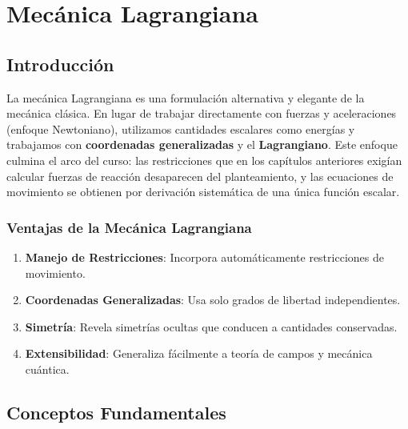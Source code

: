 
\chapter{Mecánica Lagrangiana}

\section*{Introducción}

La mecánica Lagrangiana es una formulación alternativa y elegante de la mecánica clásica. En lugar de trabajar directamente con fuerzas y aceleraciones (enfoque Newtoniano), utilizamos cantidades escalares como energías y trabajamos con \textbf{coordenadas generalizadas} y el \textbf{Lagrangiano}. Este enfoque culmina el arco del curso: las restricciones que en los capítulos anteriores exigían calcular fuerzas de reacción desaparecen del planteamiento, y las ecuaciones de movimiento se obtienen por derivación sistemática de una única función escalar.

\subsection*{Ventajas de la Mecánica Lagrangiana}

\begin{enumerate}
    \item \textbf{Manejo de Restricciones}: Incorpora automáticamente restricciones de movimiento.
    \item \textbf{Coordenadas Generalizadas}: Usa solo grados de libertad independientes.
    \item \textbf{Simetría}: Revela simetrías ocultas que conducen a cantidades conservadas.
    \item \textbf{Extensibilidad}: Generaliza fácilmente a teoría de campos y mecánica cuántica.
\end{enumerate}

\section{Conceptos Fundamentales}

